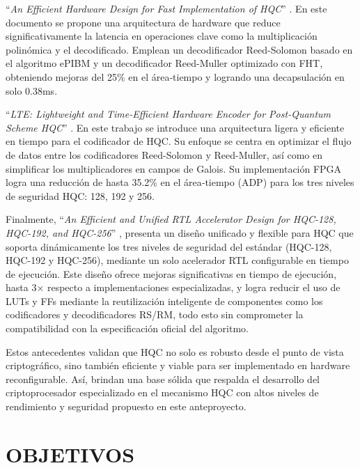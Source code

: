 “\textit{An Efficient Hardware Design for Fast Implementation of HQC}” \cite{Li2023EfficientHQC}. En este documento se propone una arquitectura de hardware que reduce significativamente la latencia en operaciones clave como la multiplicación polinómica y el decodificado. Emplean un decodificador Reed-Solomon basado en el algoritmo ePIBM y un decodificador Reed-Muller optimizado con FHT, obteniendo mejoras del 25\% en el área‑tiempo y logrando una decapsulación en solo 0.38ms.

“\textit{LTE: Lightweight and Time-Efficient Hardware Encoder for Post-Quantum Scheme HQC}” \cite{Tu2024LightweightEncoder}. En este trabajo se introduce una arquitectura ligera y eficiente en tiempo para el codificador de HQC. Su enfoque se centra en optimizar el flujo de datos entre los codificadores Reed-Solomon y Reed-Muller, así como en simplificar los multiplicadores en campos de Galois. Su implementación FPGA logra una reducción de hasta 35.2\% en el área‑tiempo (ADP) para los tres niveles de seguridad HQC: 128, 192 y 256.

Finalmente, “\textit{An Efficient and Unified RTL Accelerator Design for HQC-128, HQC-192, and HQC-256}” \cite{Tu2023UnifiedRTL}, presenta un diseño unificado y flexible para HQC que soporta dinámicamente los tres niveles de seguridad del estándar (HQC-128, HQC-192 y HQC-256), mediante un solo acelerador RTL configurable en tiempo de ejecución. Este diseño ofrece mejoras significativas en tiempo de ejecución, hasta 3× respecto a implementaciones especializadas, y logra reducir el uso de LUTs y FFs mediante la reutilización inteligente de componentes como los codificadores y decodificadores RS/RM, todo esto sin comprometer la compatibilidad con la especificación oficial del algoritmo.

Estos antecedentes validan que HQC no solo es robusto desde el punto de vista criptográfico, sino también eficiente y viable para ser implementado en hardware reconfigurable. Así, brindan una base sólida que respalda el desarrollo del criptoprocesador especializado en el mecanismo HQC con altos niveles de rendimiento y seguridad propuesto en este anteproyecto.





\chapter{OBJETIVOS}

